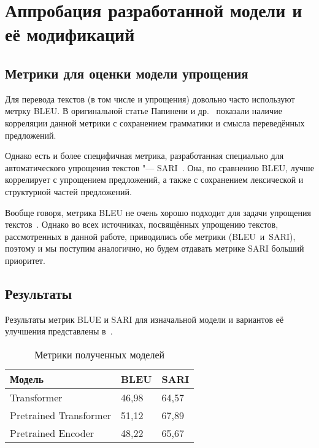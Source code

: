 

\chapter{Аппробация разработанной модели и её модификаций}


\section{Метрики для оценки модели упрощения}


Для перевода текстов (в том числе и упрощения) довольно часто используют метрку BLEU.
В оригинальной статье Папинени и др.~\cite{BLEU} показали наличие корреляции данной метрики с сохранением грамматики и смысла переведённых предложений.

Однако есть и более специфичная метрика, разработанная специально для автоматического упрощения текстов "--- SARI~\cite{SARI}.
Она, по сравнению BLEU, лучше коррелирует с упрощением предложений, а также с сохранением лексической и структурной частей предложений.

Вообще говоря, метрика BLEU не очень хорошо подходит для задачи упрощения текстов~\cite{bleu-is-dogshit}.
Однако во всех источниках, посвящённых упрощению текстов, рассмотренных в данной работе, приводились обе метрики (BLEU~и~SARI), поэтому и мы поступим аналогично, но будем отдавать метрике SARI больший приоритет.


\section{Результаты}


Результаты метрик BLUE и SARI для изначальной модели и вариантов её улучшения представлены в~.

\begin{table}[H]%
  \centering\small
  \caption{Метрики полученных моделей}
  \label{metrics}
    \begin{tabular}{|l|l|l|}
      \hline
      \textbf{Модель} & \textbf{BLEU} & \textbf{SARI} \\ \hline
      Transformer & 46{,}98 & 64{,}57 \\ \hline
      Pretrained Transformer & 51{,}12 & 67{,}89 \\ \hline
      Pretrained Encoder & 48{,}22 & 65{,}67 \\ \hline
    \end{tabular}
    \normalsize
\end{table}

